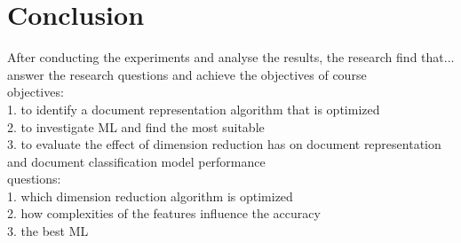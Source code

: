 \chapter{Conclusion}
After conducting the experiments and analyse the results, the research find that...\\



answer the research questions and achieve the objectives of course\\

objectives:\\
1. to identify a document representation algorithm that is optimized\\
2. to investigate ML and find the most suitable\\
3. to evaluate the effect of dimension reduction has on document representation and document classification model performance\\

questions:\\
1. which dimension reduction algorithm is optimized\\
2. how complexities of the features influence the accuracy\\
3. the best ML\\